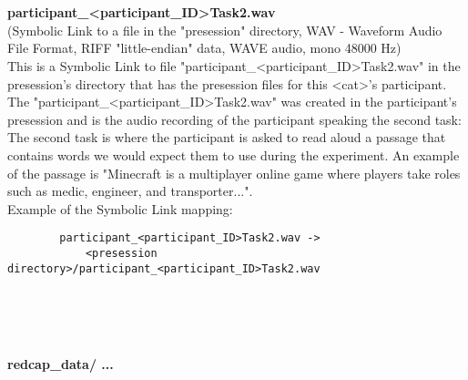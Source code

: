 \begin{description}
\begin{addmargin}[0em]{0em}
    \textbf{\\\\}
    \begin{addmargin}[1em]{0em} %
        \textbf{participant\_<participant\_ID>Task2.wav}\\
        (Symbolic Link to a file in the "presession" directory,
        WAV - Waveform Audio File Format, RIFF "little-endian" data, WAVE audio, mono 48000 Hz)\\
        This is a Symbolic Link to file "participant\_<participant\_ID>Task2.wav" in the presession's directory
        that has the presession files for this <cat>'s participant.\\
        The "participant\_<participant\_ID>Task2.wav" was created in the participant's presession and is the audio recording
        of the participant speaking the second task:\\
        The second task is where the participant is asked to read aloud a passage that contains words we would expect them
        to use during the experiment. An example of the passage is "Minecraft is a multiplayer online game where players
        take roles such as medic, engineer, and transporter...".\\ 
        Example of the Symbolic Link mapping:
        \begin{verbatim}
        participant_<participant_ID>Task2.wav ->
            <presession directory>/participant_<participant_ID>Task2.wav
        \end{verbatim}  
    \end{addmargin} %
\end{addmargin} %



\textbf{\\\\\\}
\begin{addmargin}[0em]{0em} %
    \textbf{redcap\_data/ ... }


\end{addmargin}
\end{description}
